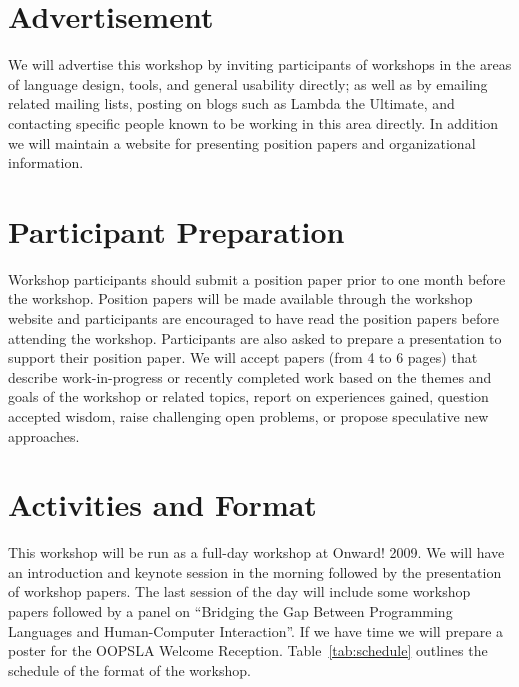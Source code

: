 \documentclass{sigplanconf}
\begin{document}
\section{Advertisement}

We will advertise this workshop by inviting participants of workshops
in the areas of language design, tools, and general usability
directly; as well as by emailing related mailing lists, posting on
blogs such as Lambda the Ultimate, and contacting specific people
known to be working in this area directly. In addition we will
maintain a website for presenting position papers and organizational
information.

\section{Participant Preparation}

Workshop participants should submit a position paper prior to one
month before the workshop. Position papers will be made available
through the workshop website and participants are encouraged to have
read the position papers before attending the workshop. Participants
are also asked to prepare a presentation to support their position
paper. We will accept papers (from 4 to 6 pages) that describe
work-in-progress or recently completed work based on the themes and
goals of the workshop or related topics, report on experiences gained,
question accepted wisdom, raise challenging open problems, or propose
speculative new approaches.

\section{Activities and Format}

This workshop will be run as a full-day workshop at Onward! 2009.  We
will have an introduction and keynote session in the morning followed
by the presentation of workshop papers.  The last session of the day
will include some workshop papers followed by a panel on ``Bridging
the Gap Between Programming Languages and Human-Computer
Interaction''. If we have time we will prepare a poster for the
OOPSLA Welcome Reception.  Table~\ref{tab:schedule} outlines the
schedule of the format of the workshop.
\end{document}
